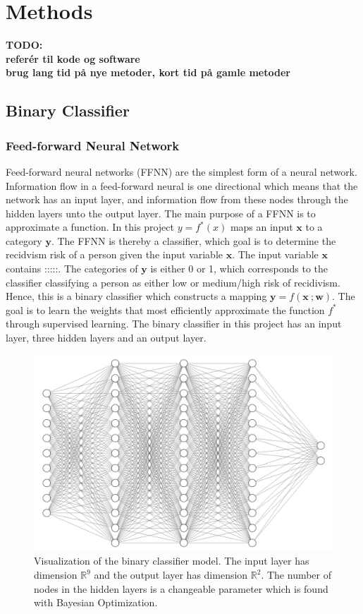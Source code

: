 \documentclass[11pt, fleqn, titlepage]{article}
\begin{document}
	
	\section{Methods}
	\textbf{TODO: \\ referér til kode og software \\ brug lang tid på nye metoder, kort tid på gamle metoder}
	
	\subsection{Binary Classifier}\label{Feed-forward neural}
	\subsubsection{Feed-forward Neural Network}
	Feed-forward neural networks (FFNN) are the simplest form of a neural network. Information flow in a feed-forward neural is one directional which means that the network has an input layer, and information flow from these nodes through the hidden layers unto the output layer. The main purpose of a FFNN is to approximate a function. In this project $ y = f^*(x) $ maps an input $ \mathbf x $ to a category $ \mathbf y $. The FFNN is thereby a classifier, which goal is to determine the recidvism risk of a person given the input variable $ \mathbf x $. The input variable $ \mathbf x $ contains :::::. The categories of $ \mathbf y $ is either 0 or 1, which corresponds to the classifier classifying a person as either low or medium/high risk of recidivism. Hence, this is a binary classifier which constructs a mapping $ \mathbf y = f(\mathbf x \ ; \mathbf w) $. The goal is to learn the weights that most efficiently approximate the function $ f^* $ through supervised learning. The binary classifier in this project has an input layer, three hidden layers and an output layer. 
	
	\begin{figure}[H]
		\centering
		\includegraphics[width=0.5\linewidth]{imgs/ffnn}
		\caption{Visualization of the binary classifier model. The input layer has dimension $ \mathbb R ^9$ and the output layer has dimension $ \mathbb R^2 $. The number of nodes in the hidden layers is a changeable parameter which is found with Bayesian Optimization. }
		\label{fig:ffnn}
	\end{figure}
	
\end{document}
